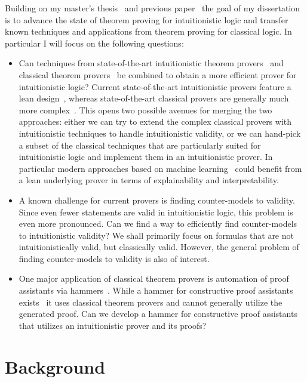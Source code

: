 \documentclass{article}
\theoremstyle{definition}
\theoremstyle{definition}
\theoremstyle{definition}
\theoremstyle{definition}
\theoremstyle{definition}
\theoremstyle{definition}
\theoremstyle{definition}
\newcommand{\0}{\mathbf 0}
\newcommand{\1}{\mathbf 1}
\newcounter{question}
\begin{document}
	Building on my master's thesis~\cite{thesis} and previous paper~\cite{pluska2023embedding} the goal of my dissertation is to advance the state of theorem proving for intuitionistic logic and transfer known techniques and applications from theorem proving for classical logic. In particular I will focus on the following questions:
	\begin{itemize}
		\item Can techniques from state-of-the-art intuitionistic theorem provers~\cite{otten2008leancop,otten2021nanocop} and classical theorem provers~\cite{kovacs2013first,schulz2002brainiac} be combined to obtain a more efficient prover for intuitionistic logic? Current state-of-the-art intuitionistic provers feature a lean design~\cite{otten2008leancop,otten2021nanocop}, whereas state-of-the-art classical provers are generally much more complex~\cite{kovacs2013first}. This opens two possible avenues for merging the two approaches: either we can try to extend the complex classical provers with intuitionistic techniques to handle intuitionistic validity, or we can hand-pick a subset of the classical techniques that are particularly suited for intuitionistic logic and implement them in an intuitionistic prover. In particular modern approaches based on machine learning~\cite{kaliszyk2018reinforcement,loos2017deep,rawson2019neurally} could benefit from a lean underlying prover in terms of explainability and interpretability.
		\item A known challenge for current provers is finding counter-models to validity. Since even fewer statements are valid in intuitionistic logic, this problem is even more pronounced. Can we find a way to efficiently find counter-models to intuitionistic validity? We shall primarily focus on formulas that are not intuitionistically valid, but classically valid. However, the general problem of finding counter-models to validity is also of interest.
		\item One major application of classical theorem provers is automation of proof assistants via hammers~\cite{bohme2010sledgehammer}. While a hammer for constructive proof assistants exists~\cite{czajka2018hammer} it uses classical theorem provers and cannot generally utilize the generated proof. Can we develop a hammer for constructive proof assistants that utilizes an intuitionistic prover and its proofs?
	\end{itemize}

	\section{Background}
\end{document}
